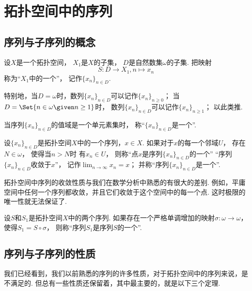 \section{拓扑空间中的序列}
\subsection{序列与子序列的概念}
\begin{definition}
设\(X\)是一个拓扑空间，
\(X_1\)是\(X\)的子集，
\(D\)是自然数集\(\omega\)的子集.
把映射\[
	S\colon D \to X_1, n \mapsto x_n
\]称为“\(X_1\)中的一个”，
记作\(\{x_n\}_{n \in D}\).
\end{definition}

特别地，当\(D = \omega\)时，数列\(\{x_n\}_{n \in D}\)可以记作\(\{x_n\}_{n\geq0}\)；
当\(D = \Set{ n \in \omega \given n \geq 1}\)时，
数列\(\{x_n\}_{n \in D}\)可以记作\(\{x_n\}_{n\geq1}\)；
以此类推.

当序列\(\{x_n\}_{n \in D}\)的值域是一个单元素集时，
称“\(\{x_n\}_{n \in D}\)是一个”.

\begin{definition}\label{definition:序列.序列的聚点}
设\(\{x_n\}_{n \in D}\)是拓扑空间\(X\)中的一个序列，\(x \in X\).
如果对于\(x\)的每一个邻域\(U\)，
存在\(N \in \omega\)，
使得当\(n > N\)时
有\(x_n \in U\)，
则称“点\(x\)是序列\(\{x_n\}_{n \in D}\)的一个”
“序列\(\{x_n\}_{n \in D}\)收敛于\(x\)”，
记作\(\lim_{n\to\infty} x_n = x\)；
并称“序列\(\{x_n\}_{n \in D}\)是一个”.
\end{definition}

拓扑空间中序列的收敛性质与我们在数学分析中熟悉的有很大的差别.
例如，平庸空间中任何一个序列都收敛，并且它们收敛于这个空间中的每一个点.
这时极限的唯一性就无法保证了.

\begin{definition}\label{definition:序列.子序列}
设\(S\)和\(S_1\)是拓扑空间\(X\)中的两个序列.
如果存在一个严格单调增加的映射\(\sigma\colon \omega \to \omega\)，
使得\(S_1 = S \circ \sigma\)，
则称“序列\(S_1\)是序列\(S\)的一个”.
\end{definition}

\subsection{序列与子序列的性质}
我们已经看到，我们以前熟悉的序列的许多性质，对于拓扑空间中的序列来说，是不满足的.
但总有一些性质还保留着，其中最主要的，就是以下三个定理.

